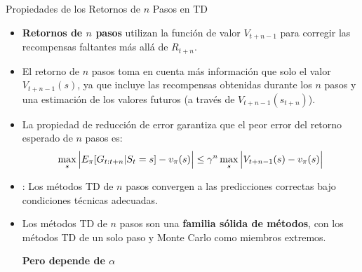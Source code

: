 \documentclass[10pt, envcountsect, handout, aspectratio=1610, hyperref={hypertexnames=true}]{beamer}
\begin{document}
\begin{frame}{Propiedades de los Retornos de \( n \) Pasos en TD}
	
	\begin{itemize}
		\item \textbf{Retornos de \( n \) pasos} utilizan la función de valor \( V_{t+n-1} \) para corregir las recompensas faltantes más allá de \( R_{t+n} \).
		
		\item El retorno de \( n \) pasos toma en cuenta más información que solo el valor \( V_{t+n-1}(s) \), ya que incluye las recompensas obtenidas durante los \( n \) pasos y una estimación de los valores futuros (a través de \( V_{t+n-1}(s_{t+n}) \)).

		\item La propiedad de reducción de error garantiza que el peor error del retorno esperado de \( n \) pasos es:
		\[\displaystyle
		\max_s \Big| E_{\pi}[G_{t:t+n} | S_t = s] - v_{\pi}(s) \Big| \leq \gamma^n \max_s \Big| V_{t+n-1}(s) - v_{\pi}(s) \Big|
		\]
		\item {}: Los métodos TD de \( n \) pasos convergen a las predicciones correctas bajo condiciones técnicas adecuadas.
		\item Los métodos TD de \( n \) pasos son una \textbf{familia sólida de métodos}, con los métodos TD de un solo paso y Monte Carlo como miembros extremos.
		
		\centerline{\textbf{Pero depende de $\alpha$}}
	\end{itemize}

\end{frame}
	



\end{document}
